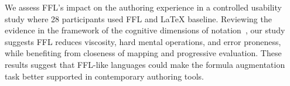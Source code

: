 


We assess FFL's impact on the authoring experience in a controlled usability study where 28 participants used FFL and  LaTeX baseline.
Reviewing the evidence in the framework of the cognitive dimensions of notation~\cite{ref:blackwell2003notational}, our study suggests FFL reduces viscosity, hard mental operations, and error proneness, while benefiting from closeness of mapping and progressive evaluation. These results suggest that FFL-like languages could make the formula augmentation task better supported in contemporary authoring tools.

